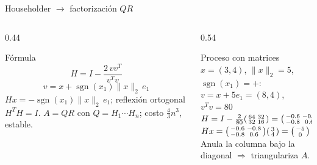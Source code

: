 \documentclass[aspectratio=169,10pt]{beamer}
\begin{document}
\begin{frame}{Householder $\rightarrow$ factorización $QR$}
\begin{columns}[T]
\begin{column}{0.44\textwidth}
\begin{cardidea}{Fórmula}{\faSuperscript}
$$H=I-\frac{2\,vv^T}{v^Tv}$$
$$v=x+\operatorname{sgn}(x_1)\|x\|_2\,e_1$$
{\footnotesize $Hx=-\operatorname{sgn}(x_1)\|x\|_2\,e_1$; reflexión ortogonal $H^TH=I$. $A=QR$ con $Q=H_1\cdots H_n$; costo $\tfrac43 n^3$, estable.}
\end{cardidea}
\end{column}
\begin{column}{0.54\textwidth}
\begin{cardgear}{Proceso con matrices}{\faTable}
{\footnotesize $x=(3,4)$, $\|x\|_2=5$, $\operatorname{sgn}(x_1)=+$:\\[1mm]
$v=x+5e_1=(8,4)$, $v^Tv=80$\\[1.4mm]
$H=I-\tfrac{2}{80}\begin{psmallmatrix}64&32\\32&16\end{psmallmatrix}=\begin{psmallmatrix}-0.6&-0.8\\-0.8&0.6\end{psmallmatrix}$\\[1.8mm]
$Hx=\begin{psmallmatrix}-0.6&-0.8\\-0.8&0.6\end{psmallmatrix}\begin{psmallmatrix}3\\4\end{psmallmatrix}=\begin{psmallmatrix}-5\\0\end{psmallmatrix}=-\|x\|_2 e_1$ \checkmark\\[1.4mm]
Anula la columna bajo la diagonal $\Rightarrow$ triangulariza $A$.}
\end{cardgear}
\end{column}
\end{columns}
\end{frame}
\end{document}
